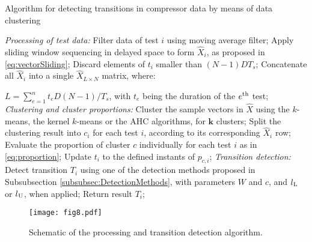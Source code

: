 \documentclass[preprint,11pt,number]{elsarticle}
\begin{document}
\begin{algorithm}[htb]
\caption{\small{Algorithm for detecting transitions in compressor data by means of data clustering}} \label{alg:pseudoCode}
\begin{algorithmic}[1]
 \vspace{5pt}
 \Statex \textit{Processing of test data:}
     \State Filter data of test $i$ using moving average filter;
     \State Apply sliding window sequencing in delayed space to form $\hat{X}_i$, as proposed in \eqref{eq:vectorSliding};
     \State Discard elements of $t_i$ smaller than $(N-1)DT_s$;
\EndFor
\State Concatenate all $\hat{X}_i$ into a single $\hat{X}_{L\times N}$ matrix, where: 

$L = \sum_{e=1}^{n} t_e D(N-1)/T_s$, with $t_e$ being the duration of the $e\textsuperscript{th}$ test;
 \vspace{5pt} 
  \Statex \textit{Clustering and cluster proportions:}
 \State Cluster the sample vectors in $\hat{X}$ using the $k$-means, the kernel $k$-means or the AHC algorithms, for $\bm{k}$ clusters;
 \State Split the clustering result into $c_i$ for each test $i$, according to its corresponding $\hat{X}_i$ row;
    \State Evaluate the proportion of cluster $c$ individually for each test $i$ as in \eqref{eq:proportion};
    \State Update $t_i$ to the defined instants of $p_{c,i}$;
 \vspace{5pt} 
 \Statex \textit{Transition detection:}
     \State Detect transition $T_i$ using one of the detection methods proposed in Subsubsection \ref{subsubsec:DetectionMethods}, with parameters $W$ and $c$, and $l\textsubscript{L}$ or $l\textsubscript{U}$, when applied;
    \State Return result $T_i$;
\EndFor
\end{algorithmic}
\end{algorithm}

\begin{figure}[htb]
\begin{center}
\texttt{[image: fig8.pdf]}    %
\caption{Schematic of the processing and transition detection algorithm.}
\label{fig:algorithm}
\end{center}
\end{figure}
\end{document}
